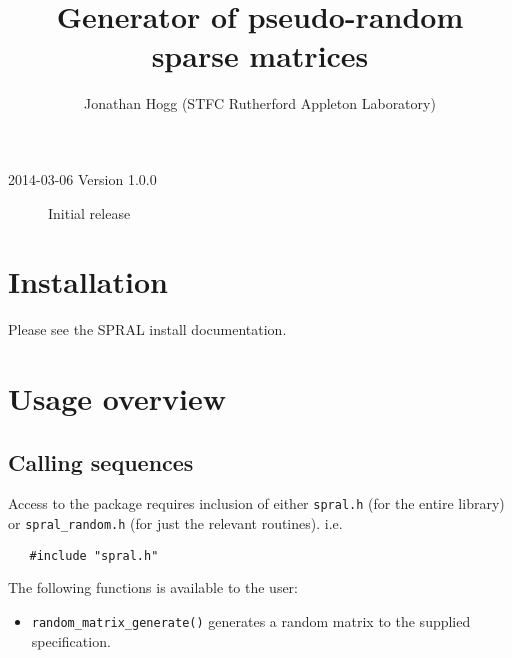 
\title{Generator of pseudo-random sparse matrices}
\author{Jonathan Hogg (STFC Rutherford Appleton Laboratory)}
\spralmaketitle
\thispagestyle{firststyle}

\versionhistory
\begin{description}
\item[2014-03-06 Version 1.0.0] Initial release
\end{description}


\section{Installation}
Please see the SPRAL install documentation.


\section{Usage overview}

\subsection{Calling sequences}

Access to the package requires inclusion of either \texttt{spral.h} (for the
entire \spral library) or \texttt{spral\_random.h} (for just the relevant routines). i.e.

\begin{verbatim}
   #include "spral.h"
\end{verbatim}

\noindent
The following functions is available to the user:
\begin{itemize}
   \item {\tt random\_matrix\_generate()} generates a random matrix to the
      supplied specification.
\end{itemize}

